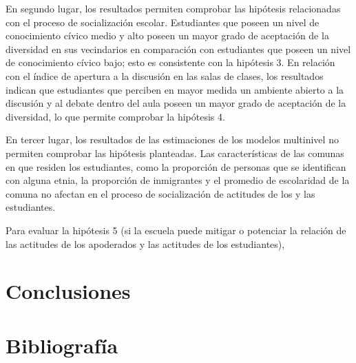 \documentclass[12pt,twoside]{templates/facsothesis}
\begin{document}
En segundo lugar, los resultados permiten comprobar las hipótesis relacionadas con el proceso de socialización escolar. Estudiantes que poseen un nivel de conocimiento cívico medio y alto poseen un mayor grado de aceptación de la diversidad en sus vecindarios en comparación con estudiantes que poseen un nivel de conocimiento cívico bajo; esto es consistente con la hipótesis 3. En relación con el índice de apertura a la discusión en las salas de clases, los resultados indican que estudiantes que perciben en mayor medida un ambiente abierto a la discusión y al debate dentro del aula poseen un mayor grado de aceptación de la diversidad, lo que permite comprobar la hipótesis 4.

En tercer lugar, los resultados de las estimaciones de los modelos multinivel no permiten comprobar las hipótesis planteadas. Las características de las comunas en que residen los estudiantes, como la proporción de personas que se identifican con alguna etnia, la proporción de inmigrantes y el promedio de escolaridad de la comuna no afectan en el proceso de socialización de actitudes de los y las estudiantes.

Para evaluar la hipótesis 5 (si la escuela puede mitigar o potenciar la relación de las actitudes de los apoderados y las actitudes de los estudiantes),

\hypertarget{conclusiones}{%
\chapter{Conclusiones}\label{conclusiones}}

\hypertarget{bibliografuxeda}{%
\chapter*{Bibliografía}\label{bibliografuxeda}}



\end{document}
